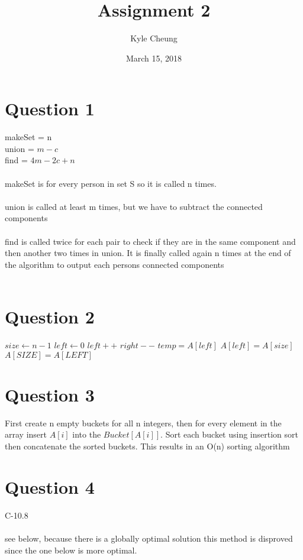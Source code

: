 \documentclass{article}
\title{Assignment 2}
\date{March 15, 2018}
\author{Kyle Cheung}
\begin{document}
\maketitle
\newpage
{}


\section*{Question 1}
makeSet = n\\
union = $m - c$\\
find = $4m -2c + n$\\
\\
makeSet is for every person in set S so it is called n times.\\
\\
union is called at least m times, but we have to subtract the connected components\\
\\
find is called twice for each pair to check if they are in the same component and then another two times in union. It is finally called again n times at the end of the algorithm to output each persons connected components\\
\\
\section*{Question 2} 
\begin{algorithmic}
  \STATE$size\gets n-1$
  \STATE$left\gets 0$
  \STATE$left++$
  \ENDWHILE{}
  \STATE$right--$
  \ENDWHILE{}
  \STATE$temp = A[left]$
  \STATE$A[left] = A[size]$
  \STATE$A[SIZE] = A[LEFT]$
\end{algorithmic}

\section*{Question 3}
First create n empty buckets for all n integers, then for every element in the array insert $A[i]$ into the $Bucket[A[i]]$. Sort each bucket using insertion sort then concatenate the sorted buckets. This results in an O(n) sorting algorithm

\section*{Question 4}

C-10.8\\
\\
see below, because there is a globally optimal solution this method is disproved since the one below is more optimal.\\
\\
\end{document}
